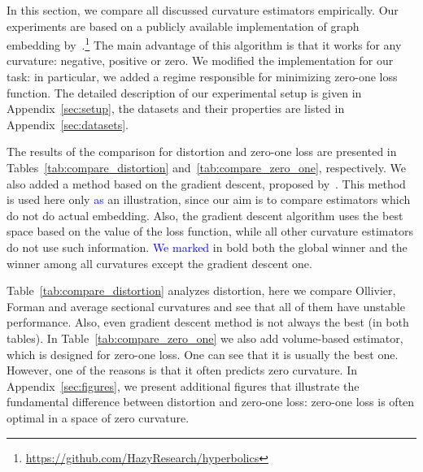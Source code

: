 \documentclass{article} %
\newcommand{\ph}[1]{\textcolor{blue}{#1}}
\begin{document}
In this section, we compare all discussed curvature estimators empirically. Our experiments are based on a publicly available implementation of graph embedding by~\citet{gu2019learning}.\footnote{\url{https://github.com/HazyResearch/hyperbolics}} The main advantage of this algorithm is that it works for any curvature: negative, positive or zero. We modified the implementation for our task: in particular, we added a regime responsible for minimizing zero-one loss function. The detailed description of our experimental setup is given in Appendix~\ref{sec:setup}, the datasets and their properties are listed in Appendix~\ref{sec:datasets}.

The results of the comparison for distortion and zero-one loss are presented in Tables~\ref{tab:compare_distortion} and~\ref{tab:compare_zero_one}, respectively. We also added a method based on the gradient descent, proposed by~\citet{gu2019learning}. This method is used here only \ph{as} an illustration, since our aim is to compare estimators which do not do actual embedding.
Also, the gradient descent algorithm uses the best space based on the value of the loss function, while all other curvature estimators do not use such information.
\ph{We marked} in bold both the global winner and the winner among all curvatures except the gradient descent one. 

Table~\ref{tab:compare_distortion} analyzes distortion, here we compare Ollivier, Forman and average sectional curvatures and see that all of them have unstable performance. Also, even gradient descent method is not always the best (in both tables). In Table~\ref{tab:compare_zero_one} we also add volume-based estimator, which is designed for zero-one loss. 
One can see that it is usually the best one. 
However, one of the reasons is that it often predicts zero curvature. In Appendix~\ref{sec:figures}, we present additional figures that illustrate the fundamental difference between distortion and zero-one loss: zero-one loss is often optimal in a space of zero curvature.
\end{document}
